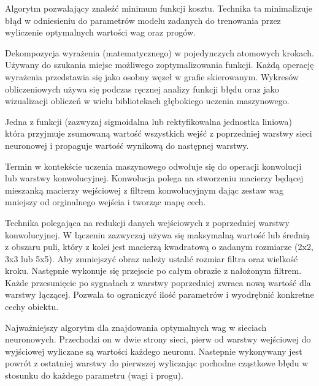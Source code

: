 \documentclass[12pt,a4paper,twoside,titlepage,openright]{book}
\begin{document}
\begin{description}[style=nextline]
	\item[Metoda gradientu prostego (ang. gradient descent algorithm)] Algorytm pozwalający znaleźć minimum funkcji kosztu. Technika ta minimalizuje błąd w odniesieniu do parametrów modelu zadanych do trenowania przez wyliczenie optymalnych wartości wag oraz progów.%
	\item[Wykres obliczeniowy (ang. computation graph)] Dekompozycja wyrażenia (matematycznego) w pojedynczych atomowych krokach. Używany do szukania miejsc możliwego zoptymalizowania funkcji. Każdą operację wyrażenia przedstawia się jako osobny węzeł w grafie skierowanym. Wykresów obliczeniowych używa się podczas ręcznej analizy funkcji błędu oraz jako wizualizacji obliczeń w wielu bibliotekach głębokiego uczenia maszynowego.
	\item[Funkcja aktywacji] Jedna z funkcji (zazwyzaj sigmoidalna lub rektyfikowalna jednostka liniowa) która przyjmuje zsumowaną wartość wszystkich wejść z poprzedniej warstwy sieci neuronowej i propaguje wartość wynikową do następnej warstwy.
	\item[Konwolucja] Termin w kontekście uczenia maszynowego odwołuje się do operacji konwolucji lub warstwy konwolucyjnej. Konwolucja polega na stworzeniu macierzy będącej mieszanką macierzy wejściowej z filtrem konwolucyjnym dając zestaw wag mniejszy od orginalnego wejścia i tworząc mapę cech.
	\item[Łączenie (ang. pooling)] Technika polegająca na redukcji danych wejściowych z poprzedniej warstwy konwolucyjnej. W łączeniu zazwyczaj używa się maksymalną wartość lub średnią z obszaru puli, który z kolei jest macierzą kwadratową o zadanym rozmiarze (2x2, 3x3 lub 5x5). Aby zmniejszyć obraz należy ustalić rozmiar filtra oraz wielkość kroku. Następnie wykonuje się przejscie po całym obrazie z nałożonym filtrem. Każde przesunięcie po sygnałach z warstwy poprzedniej zwraca nową wartość dla warstwy łączącej. Pozwala to ograniczyć ilość parametrów i wyodrębnić konkretne cechy obiektu.
	\item[Wsteczna propagacja błędu] Najważniejszy algorytm dla znajdowania optymalnych wag w sieciach neuronowych. Przechodzi on w dwie strony sieci, pierw od warstwy wejściowej do wyjściowej wyliczane są wartości każdego neuronu. Nastepnie wykonywany jest powrót z ostatniej warstwy do pierwszej wyliczając pochodne cząstkowe błędu w stosunku do każdego parametru (wagi i progu).

\end{description}
\end{document}
